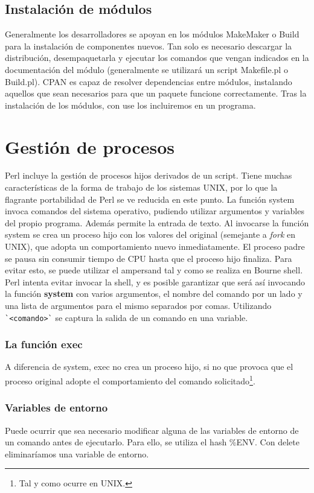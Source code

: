 \documentclass[12pt,a4paper]{memoir} %
\begin{document}
	\section{Instalación de módulos}
	Generalmente los desarrolladores se apoyan en los módulos MakeMaker o Build para la instalación de componentes nuevos. Tan solo es necesario descargar la distribución, desempaquetarla y ejecutar los comandos que vengan indicados en la documentación del módulo (generalmente se utilizará un script Makefile.pl o Build.pl).
	CPAN es capaz de resolver dependencias entre módulos, instalando aquellos que sean necesarios para que un paquete funcione correctamente.
	Tras la instalación de los módulos, con use los incluiremos en un programa.
	\chapter{Gestión de procesos}
	Perl incluye la gestión de procesos hijos derivados de un script. Tiene muchas características de la forma de trabajo de los sistemas UNIX, por lo que la flagrante portabilidad de Perl se ve reducida en este punto.
	La función system invoca comandos del sistema operativo, pudiendo utilizar argumentos y variables del propio programa. Además permite la entrada de texto.
	Al invocarse la función system se crea un proceso hijo con los valores del original (semejante a \textit{fork} en UNIX), que adopta un comportamiento nuevo inmediatamente. El proceso padre se pausa sin consumir tiempo de CPU hasta que el proceso hijo finaliza. Para evitar esto, se puede utilizar el ampersand tal y como se realiza en Bourne shell.
	Perl intenta evitar invocar la shell, y es posible garantizar que será así invocando la función \textbf{system} con varios argumentos, el nombre del comando por un lado y una lista de argumentos para el mismo separados por comas.
	Utilizando \verb+`<comando>`+ se captura la salida de un comando en una variable. 
	\subsection{La función exec}
	A diferencia de system, exec no crea un proceso hijo, si no que provoca que el proceso original adopte el comportamiento del comando solicitado\footnote{Tal y como ocurre en UNIX.}.
	\subsection{Variables de entorno}
	Puede ocurrir que sea necesario modificar alguna de las variables de entorno de un comando antes de ejecutarlo. Para ello, se utiliza el hash \%ENV.
	Con delete eliminaríamos una variable de entorno.
\end{document}
